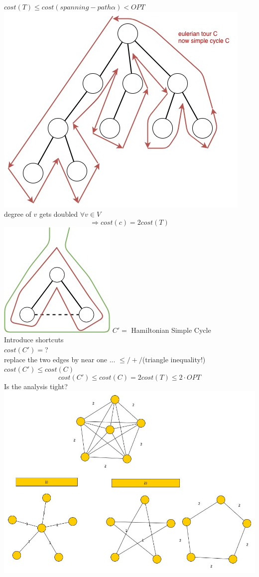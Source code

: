 $cost(T) \leq cost(spanning-path \alpha) < OPT$ \\
\includegraphics[scale=0.5]{img/cycle1} degree of $v$ gets doubled $\forall v \in V$ 
$$\Rightarrow cost(c) = 2 cost(T)$$
\includegraphics[scale=0.5]{img/cycle2} $C'=$ Hamiltonian Simple Cycle \\
Introduce shortcuts \\ $cost(C')=$? \\
replace the two edges by near one ... $\leq/+/$(triangle inequality!) \\
$cost(C') \leq cost(C)$
$$cost(C') \leq cost(C) = 2cost(T) \leq 2 \cdot OPT$$
Is the analysis tight? \\
\includegraphics[scale=0.5]{img/graph33}
